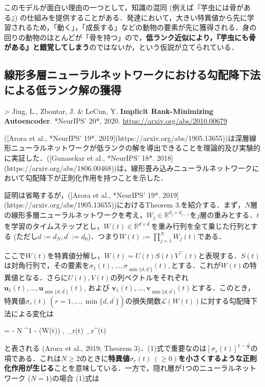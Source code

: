 このモデルが面白い理由の一つとして，知識の混同 (例えば『芋虫には骨がある』) の仕組みを提供することがある．発達において，大きい特異値から先に学習されるため，「動く」，「成長する」などの動物の要素が先に獲得される．身の回りの動物のほとんどが「骨を持つ」ので，\textbf{低ランク近似により，『芋虫にも骨がある』と錯覚してしまう}のではないか，という仮説が立てられている．
\subsection{線形多層ニューラルネットワークにおける勾配降下法による低ランク解の獲得}

> Jing, L., Zbontar, J. & LeCun, Y. \textbf{Implicit Rank-Minimizing Autoencoder}. *NeurIPS' 20*, 2020. \url{https://arxiv.org/abs/2010.00679}

([Arora et al., *NeurIPS' 19*. 2019](https://arxiv.org/abs/1905.13655))は深層線形ニューラルネットワークが低ランクの解を導出できることを理論的及び実験的に実証した．([Gunasekar et al., *NeurIPS' 18*. 2018](https://arxiv.org/abs/1806.00468))は，線形畳み込みニューラルネットワークにおいて勾配降下が正則化作用を持つことを示した．

証明は省略するが，([Arora et al., *NeurIPS' 19*. 2019](https://arxiv.org/abs/1905.13655))におけるTheorem 3.を紹介する．まず，$N$層の線形多層ニューラルネットワークを考え，$W_j \in \mathbb{R}^{d_j \times d_{j−1}}$を$j$層の重みとする．$t$を学習のタイムステップとし，$W(t) \in \mathbb{R}^{d \times d^\prime}$を重み行列を全て乗じた行列とする (ただし$d := d_N, d^\prime := d_0$)．つまり$W(t):=\prod_{j=1}^N W_j(t)$である．

ここで$W(t)$を特異値分解し，$W(t) = U(t)S(t)V^\top(t)$と表現する．$S(t)$は対角行列で，その要素を$\sigma_1(t), \ldots , \sigma_{\min\{d, d^\prime\}}(t),$とする．これが$W(t)$の特異値となる．さらに$U(t), V (t)$の列ベクトルをそれぞれ $\mathbf{u}_1(t), \ldots, \mathbf{u}_{\min\{d, d^\prime\}}(t)$, および $\mathbf{v}_1(t), \ldots, \mathbf{v}_{\min\{d,d^\prime \}}(t)$とする．このとき，特異値$ \sigma_r(t)\ (r=1, \ldots, \min\{d,d^\prime \})$の損失関数$\mathcal{L}(W(t))$に対する勾配降下法による変化は


 = - N \cdot {}^{1 - } \cdot \left\langle \nabla {}(W(t)) , _r(t) _r^\top(t) \right\rangle


と表される (Arora et al., 2019; Theorem 3)．(1)式で重要なのは$\left[\sigma_r(t)\right]^{1 - \frac{1}{N}}$の項である．これは$N\geq 2$のときに\textbf{特異値$\sigma_r(t)\ (\geq 0)$を小さくするような正則化作用が生じる}ことを意味している．一方で，隠れ層が1つのニューラルネットワーク ($N=1$)の場合 (1)式は


